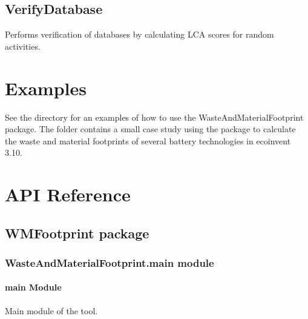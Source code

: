 \documentclass[letterpaper,10pt,english]{sphinxmanual}
\begin{document}
\section{VerifyDatabase}
\label{\detokenize{modules:verifydatabase}}
\sphinxAtStartPar
Performs verification of databases by calculating LCA scores for random activities.

\sphinxstepscope


\chapter{Examples}
\label{\detokenize{examples:examples}}\label{\detokenize{examples::doc}}
\sphinxAtStartPar
See the  directory for an examples of how to use the WasteAndMaterialFootprint package.
The folder  contains a small case study using the package to calculate the waste and material footprints of several battery technologies in ecoinvent 3.10.

\sphinxstepscope


\chapter{API Reference}
\label{\detokenize{modules_api:api-reference}}\label{\detokenize{modules_api::doc}}
\sphinxstepscope


\section{WMFootprint package}
\label{\detokenize{WMFootprint_api:wmfootprint-package}}\label{\detokenize{WMFootprint_api::doc}}

\subsection{WasteAndMaterialFootprint.main module}
\label{\detokenize{WMFootprint_api:module-WasteAndMaterialFootprint.main}}\label{\detokenize{WMFootprint_api:wasteandmaterialfootprint-main-module}}

\subsubsection{main Module}
\label{\detokenize{WMFootprint_api:main-module}}
\sphinxAtStartPar
Main module of the  tool.
\end{document}
